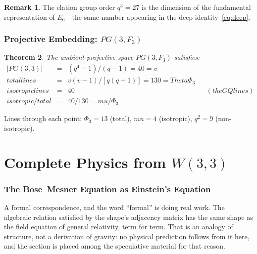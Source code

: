 \documentclass[12pt,a4paper]{article}
\def\mathbb#1{#1}%
\def\mathrm#1{#1}%
\def\text#1{#1}%
\def\mu{mu}%
\def\Phi#1{Phi#1}%
\def\Theta{Theta}%
\newtheorem{theorem}{Theorem}[section]
\theoremstyle{definition}
\newtheorem{remark}[theorem]{Remark}
\newcommand{\PG}{\mathrm{PG}}
\newcommand{\Phithree}{\Phi_3}
\newcommand{\FF}{\mathbb{F}}
\begin{document}
\begin{remark}
The elation group order $q^3=27$ is the dimension of the
fundamental representation of $E_6$---the same number appearing in
the deep identity~\eqref{eq:deep}.
\end{remark}


\section{\texorpdfstring{Projective Embedding: $\PG(3,\FF_3)$}{Projective Embedding: PG(3,F3)}}
\label{sec:pg}

\begin{theorem}
The ambient projective space $\PG(3,\FF_3)$ satisfies:
\begin{equation}
\renewcommand{\arraystretch}{1.3}
\begin{array}{rclcl}
|\PG(3,3)| &=& (q^4-1)/(q-1) = 40 = v && \\[3pt]
\text{total lines} &=& v(v-1)/[q(q+1)] = 130 = \Theta\Phithree && \\[3pt]
\text{isotropic lines} &=& 40 &&\text{(the GQ lines)} \\[3pt]
\text{isotropic/total} &=& 40/130 = \mu/\Phithree &&
\end{array}
\end{equation}
\end{theorem}

Lines through each point:
$\Phithree = 13$ (total), $\mu = 4$ (isotropic), $q^2 = 9$ (non-isotropic).


\newpage
\part{\texorpdfstring{Complete Physics from $W(3,3)$}{Complete Physics from W(3,3)}}

\section{The Bose--Mesner Equation as Einstein's Equation}

\begin{plainbox}
A formal correspondence, and the word ``formal'' is doing real work. The algebraic
relation satisfied by the shape's adjacency matrix has the same shape as the field equation
of general relativity, term for term. That is an analogy of structure, not a derivation of
gravity: no physical prediction follows from it here, and the section is placed among the
speculative material for that reason.
\end{plainbox}
\end{document}

